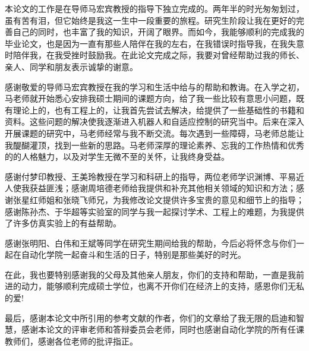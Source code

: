 
\begin{thanks}

本论文的工作是在导师马宏宾教授的指导下独立完成的。两年半的时光匆匆划过，虽有苦有泪，但它始终是我这一生中一段重要的旅程。研究生阶段让我在更好的完善自己的同时，也丰富了我的知识，开阔了眼界。而如今，我能够顺利的完成我的毕业论文，也是因为一直有那些人陪伴在我的左右，在我错误时指导我，在我失意时陪伴我，在我受挫时鼓励我。在此论文完成之际，我要对曾经帮助过我的师长、亲人、同学和朋友表示诚挚的谢意。

感谢敬爱的导师马宏宾教授在我的学习和生活中给与的帮助和教诲。在入学之初，马老师就开始悉心安排我硕士期间的课题方向，给了我一些比较有意思小问题，既有理论上的，也有工程上的，让我首先尝试去解决，给提供了一些基础性的书籍和资料。这些问题的解决使我逐渐进入机器人和自适应控制的研究当中。后来在深入开展课题的研究中，马老师经常与我不断交流。每次遇到一些障碍，马老师总能让我醍醐灌顶，找到一些新的思路。马老师深厚的理论素养、忘我的工作热情和优秀的的人格魅力，以及对学生无微不至的关怀，让我终身受益。

感谢付梦印教授、王美玲教授在学习和科研上的指导，两位老师学识渊博、平易近人使我获益匪浅；感谢周培德老师给我提供和补充其他相关领域的知识和方法；感谢张星红师姐和张晓飞师兄，为我修改论文提供许多宝贵的意见和细节上的指导；感谢陈孙杰、于华超等实验室的同学与我一起探讨学术、工程上的难题，为我提供了许多仿真实验上的有益帮助。

感谢张明阳、白伟和王斌等同学在研究生期间给我的帮助，今后必将怀念与你们一起在自动化学院一起奋斗和生活的日子，特别是那些美好的时光。

在此，我也要特别感谢我的父母及其他亲人朋友，你们的支持和帮助，一直是我前进的动力，能够顺利完成硕士学位，也离不开你们在经济上的支持，感恩你们无私的爱!

最后，感谢本论文中所引用的参考文献的作者，你们的文章给了我无限的启迪和智慧，感谢本论文的评审老师和答辩委员会老师，同时也感谢自动化学院的所有任课教师们，感谢各位老师的批评指正。

\end{thanks}
